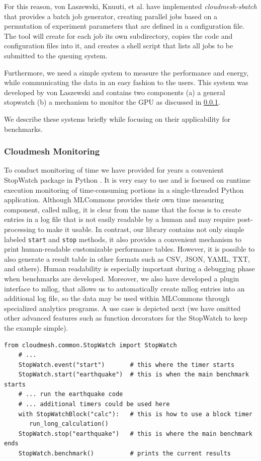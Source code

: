 \documentclass[utf8]{FrontiersinVancouver} %
\begin{document}
For this reason, von Laszewski, Knuuti, et al. have implemented {\it
  cloudmesh-sbatch} that provides a batch job generator, creating parallel jobs based on a permutation of experiment parameters that are defined in a configuration file. The tool will create for each job its own subdirectory, copies the code and configuration files into it, and creates a shell script that lists all jobs to be submitted to the queuing system.

Furthermore, we need a simple system to measure the performance and energy, while communicating the data in an easy fashion to the users. This system was developed by von Laszewski and contains two components (a) a general stopwatch (b) a mechanism to monitor the GPU as discussed in \ref{sec:monitoring}.

We describe these systems briefly while focusing on their applicability for benchmarks.

\subsubsection{Cloudmesh Monitoring}
\label{sec:monitoring}

To conduct monitoring of time we have provided for years a convenient StopWatch package in Python \citep{cloudmesh-stopwatch}.  It is very easy to use and is focused on runtime execution monitoring of time-consuming portions in a single-threaded Python application. Although MLCommons provides their own time measuring component, called mllog, it is clear from the name that the focus is to create entries in a log file that is not easily readable by a human and may require post-processing to make it usable. In contrast, our library contains not only simple labeled \verb|start| and \verb|stop| methods, it also provides a convenient mechanism to print human-readable customizable performance tables. However, it is possible to also generate a result table in other formats such as CSV, JSON, YAML, TXT, and others).  Human readability is especially important during a debugging phase when benchmarks are developed. Moreover, we also have developed a plugin interface to mllog, that allows us to automatically create mllog entries into an additional log file, so the data may be used within MLCommons through specialized analytics programs. A use case is depicted next (we have omitted other advanced features such as function decorators for the StopWatch to keep the example simple).

{\fontsize{6pt}{6pt}\selectfont
\begin{lstlisting}[style=python]
    from cloudmesh.common.StopWatch import StopWatch 
    # ...
    StopWatch.event("start")       # this where the timer starts
    StopWatch.start("earthquake")  # this is when the main benchmark starts
    # ... run the earthquake code
    # ... additional timers could be used here
    with StopWatchBlock("calc"):   # this is how to use a block timer
       run_long_calculation()
    StopWatch.stop("earthquake")   # this is where the main benchmark ends
    StopWatch.benchmark()          # prints the current results
\end{lstlisting}
}
\end{document}
